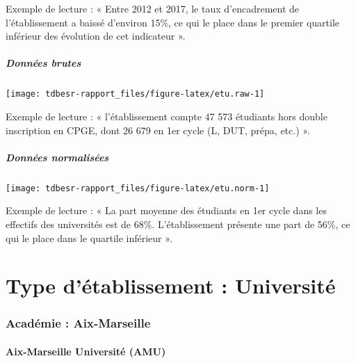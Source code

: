 \documentclass[11pt,french,landscape]{article}
\begin{document}
\begin{multicols}{2}
Exemple de lecture : « Entre 2012 et 2017, le taux d'encadrement de
l'établissement a baissé d'environ 15\%, ce qui le place dans le premier
quartile inférieur des évolution de cet indicateur ».

\hypertarget{donnuxe9es-brutes}{%
\subsubsection{Données brutes}\label{donnuxe9es-brutes}}

\begin{center}\texttt{[image: tdbesr-rapport\_files/figure-latex/etu.raw-1]} \end{center}

Exemple de lecture : « l'établissement compte 47 573 étudiants hors
double inscription en CPGE, dont 26 679 en 1er cycle (L, DUT, prépa,
etc.) ».

\hypertarget{donnuxe9es-normalisuxe9es}{%
\subsubsection{Données normalisées}\label{donnuxe9es-normalisuxe9es}}

\begin{center}\texttt{[image: tdbesr-rapport\_files/figure-latex/etu.norm-1]} \end{center}

Exemple de lecture : « La part moyenne des étudiants en 1er cycle dans
les effectifs des universités est de 68\%. L'établissement présente une
part de 56\%, ce qui le place dans le quartile inférieur ».

\end{multicols}

\newpage
\scriptsize

\newpage   
\vspace*{5cm}   
\part{Type d'établissement :  Université }   
\newpage

\hypertarget{acaduxe9mie-aix-marseille}{%
\section{Académie : Aix-Marseille}\label{acaduxe9mie-aix-marseille}}

\hypertarget{aix-marseille-universituxe9-amu}{%
\subsection{Aix-Marseille Université
(AMU)}\label{aix-marseille-universituxe9-amu}}
\end{document}
